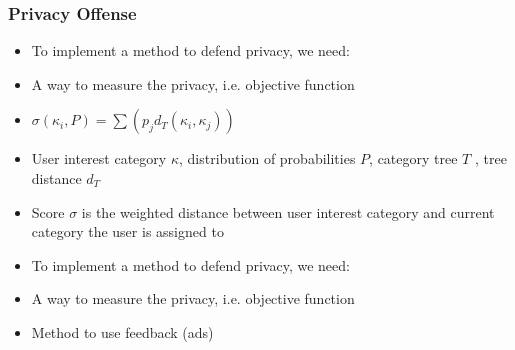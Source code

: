\documentclass{beamer}
\begin{document}

\begin{frame}
	\frametitle{Privacy Offense}
	\begin{itemize} %
		\item To implement a method to defend privacy, we need:
		\item A way to measure the privacy, i.e. objective function
		\item $\sigma(\kappa_{i},P)=\sum(p_{j}d_T(\kappa_{i},\kappa_{j}))$
		\item User interest category $\kappa$, distribution of probabilities $P$, category tree $T$ , tree distance $d_{T}$
		\item Score $\sigma$ is the weighted distance between user interest category and current
		category the user is assigned to
	\end{itemize}
\end{frame}


\begin{frame}
	\begin{itemize} %
	\item To implement a method to defend privacy, we need:
	\item A way to measure the privacy, i.e. objective function
	\item Method to use feedback (ads)
	\end{itemize}
\end{frame}
\end{document}
